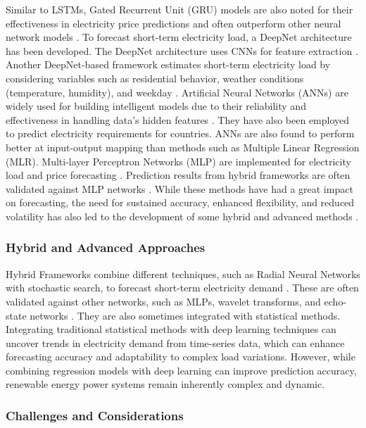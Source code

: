 \documentclass[conference]{IEEEtran}
\begin{document}
Similar to LSTMs, Gated Recurrent Unit (GRU) models are also noted for their effectiveness in electricity price predictions and often outperform other neural network models \cite{bedi2019deep}. To forecast short-term electricity load, a DeepNet architecture has been developed. The DeepNet architecture uses CNNs for feature extraction \cite{ugbehe2025}. Another DeepNet-based framework estimates short-term electricity load by considering variables such as residential behavior, weather conditions (temperature, humidity), and weekday \cite{zhao2025short,ugbehe2025,pallonetto2021}. Artificial Neural Networks (ANNs) are widely used for building intelligent models due to their reliability and effectiveness in handling data's hidden features \cite{bedi2019deep}. They have also been employed to predict electricity requirements for countries. ANNs are also found to perform better at input-output mapping than methods such as Multiple Linear Regression (MLR). Multi-layer Perceptron Networks (MLP) are implemented for electricity load and price forecasting \cite{bedi2019deep}. Prediction results from hybrid frameworks are often validated against MLP networks \cite{zhao2025short}. While these methods have had a great impact on forecasting, the need for sustained accuracy, enhanced flexibility, and reduced volatility has also led to the development of some hybrid and advanced methods \cite{pallonetto2021,ugbehe2025}. 

 

\subsubsection {Hybrid and Advanced Approaches} 

Hybrid Frameworks combine different techniques, such as Radial Neural Networks with stochastic search, to forecast short-term electricity demand \cite{zhao2025short}. These are often validated against other networks, such as MLPs, wavelet transforms, and echo-state networks \cite{bedi2019deep}. They are also sometimes integrated with statistical methods. Integrating traditional statistical methods with deep learning techniques can uncover trends in electricity demand from time-series data, which can enhance forecasting accuracy and adaptability to complex load variations. However, while combining regression models with deep learning can improve prediction accuracy, renewable energy power systems remain inherently complex and dynamic.

\subsubsection {Challenges and Considerations}
\end{document}
